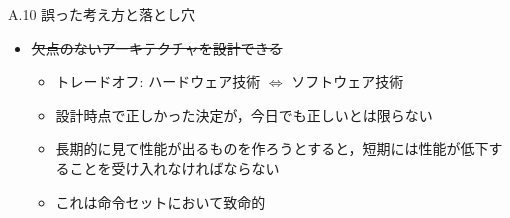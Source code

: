 \documentclass[dvipdfmx]{beamer}
\begin{document}
	\begin{frame}{A.10 誤った考え方と落とし穴}
		\begin{itemize}
			\item \sout{欠点のないアーキテクチャを設計できる}\\
				\begin{itemize}
					\item トレードオフ: ハードウェア技術 $\Leftrightarrow$ ソフトウェア技術
					\item 設計時点で正しかった決定が，今日でも正しいとは限らない
					\item 長期的に見て性能が出るものを作ろうとすると，短期には性能が低下することを受け入れなければならない
					\item これは命令セットにおいて致命的
				\end{itemize}
		\end{itemize}
	\end{frame}
\end{document}
